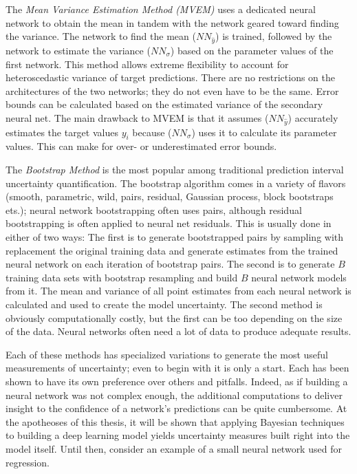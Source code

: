 The \textit{Mean Variance Estimation Method (MVEM)} uses a dedicated neural network to obtain the mean in tandem with the network geared toward finding the variance.  The network to find the mean ($NN_{\hat{y}}$) is trained, followed by the network to estimate the variance ($NN_{\sigma}$) based on the parameter values of the first network.  This method allows extreme flexibility to account for heteroscedastic variance of target predictions.  There are no restrictions on the architectures of the two networks; they do not even have to be the same.  Error bounds can be calculated based on the estimated variance of the secondary neural net.  The main drawback to MVEM is that it assumes ($NN_{\hat{y}}$) accurately estimates the target values $y_i$ because ($NN_{\sigma}$) uses it to calculate its parameter values.  This can make for over- or underestimated error bounds.

The \textit{Bootstrap Method} is the most popular among traditional prediction interval uncertainty quantification.  The bootstrap algorithm comes in a variety of flavors (smooth,
parametric, wild, pairs, residual, Gaussian process, block
bootstraps ets.); neural network bootstrapping often uses pairs, although residual bootstrapping is often applied to neural net residuals.  This is usually done in either of two ways:  The first is to generate bootstrapped pairs by sampling with replacement the original training data and generate estimates from the trained neural network on each iteration of bootstrap pairs.  The second is to generate $B$ training data sets with bootstrap resampling and build $B$ neural network models from it.  The mean and variance of all point estimates from each neural network is calculated and used to create the model uncertainty.  The second method is obviously computationally costly, but the first can be too depending on the size of the data.  Neural networks often need a lot of data to produce adequate results.

Each of these methods has specialized variations to generate the most useful measurements of uncertainty; even to begin with it is only a start.  Each has been shown to have its own preference over others and pitfalls.  Indeed, as if building a neural network was not complex enough, the additional computations to deliver insight to the confidence of a network's predictions can be quite cumbersome. At the apotheoses of this thesis, it will be shown that applying Bayesian techniques to building a deep learning model yields uncertainty measures built right into the model itself.  Until then, consider an example of a small neural network used for regression.

